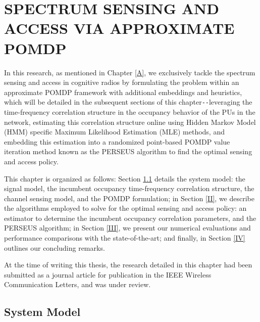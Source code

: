 \chapter{SPECTRUM SENSING AND ACCESS VIA APPROXIMATE POMDP}\label{C}
In this research, as mentioned in Chapter \ref{A}, we exclusively tackle the spectrum sensing and access in cognitive radios by formulating the problem within an approximate POMDP framework with additional embeddings and heuristics, which will be detailed in the subsequent sections of this chapter\texttt{-{}-}leveraging the time-frequency correlation structure in the occupancy behavior of the PUs in the network, estimating this correlation structure online using Hidden Markov Model (HMM) specific Maximum Likelihood Estimation (MLE) methods, and embedding this estimation into a randomized point-based POMDP value iteration method known as the PERSEUS algorithm to find the optimal sensing and access policy.

This chapter is organized as follows: Section \ref{I} details the system model: the signal model, the incumbent occupancy time-frequency correlation structure, the channel sensing model, and the POMDP formulation; in Section \ref{II}, we describe the algorithms employed to solve for the optimal sensing and access policy: an estimator to determine the incumbent occupancy correlation parameters, and the PERSEUS algorithm; in Section \ref{III}, we present our numerical evaluations and performance comparisons with the state-of-the-art; and finally, in Section \ref{IV} outlines our concluding remarks.

At the time of writing this thesis, the research detailed in this chapter had been submitted as a journal article \cite{WCL:paper} for publication in the IEEE Wireless Communication Letters, and was under review.
\section{System Model}\label{I}
